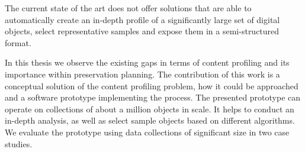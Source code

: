 The current state of the art does not offer solutions that are able to automatically create an in-depth profile of a significantly large set of digital objects, select representative samples and expose them in a semi-structured format.	

In this thesis we observe the existing gaps in terms of content profiling and its importance within preservation
planning.
The contribution of this work is a conceptual solution of the content profiling problem, how it could be approached and a software prototype implementing the process.
The presented prototype can operate on collections of about a million objects in scale. It helps to conduct an in-depth analysis, as well as select sample objects based on different algorithms.
We evaluate the prototype using data collections of significant size in two case studies.